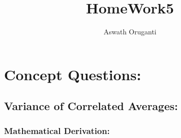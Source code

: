 \documentclass[twoside, 10pt]{article}
\begin{document}
\title{\textbf{\Large HomeWork5}}
\author{Aswath Oruganti}
\maketitle

\section{Concept Questions:}
\subsection{Variance of Correlated Averages:}
\subsubsection{Mathematical Derivation:}
\end{document}
